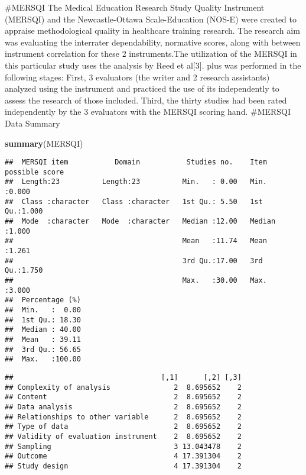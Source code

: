 \documentclass[]{article}
\newenvironment{Shaded}{\begin{snugshade}}{\end{snugshade}}
\newcommand{\KeywordTok}[1]{\textcolor[rgb]{0.13,0.29,0.53}{\textbf{#1}}}
\newcommand{\NormalTok}[1]{#1}
\newcommand{\OperatorTok}[1]{\textcolor[rgb]{0.81,0.36,0.00}{\textbf{#1}}}
\begin{document}
\#MERSQI The Medical Education Research Study Quality Instrument
(MERSQI) and the Newcastle-Ottawa Scale-Education (NOS-E) were created
to appraise methodological quality in healthcare training research. The
research aim was evaluating the interrater dependability, normative
scores, along with between instrument correlation for these 2
instruments.The utilization of the MERSQI in this particular study uses
the analysis by Reed et al{[}3{]}. plus was performed in the following
stages: First, 3 evaluators (the writer and 2 research assistants)
analyzed using the instrument and practiced the use of its independently
to assess the research of those included. Third, the thirty studies had
been rated independently by the 3 evaluators with the MERSQI scoring
hand. \#MERSQI Data Summary

\begin{Shaded}
\begin{Highlighting}[]
\KeywordTok{summary}\NormalTok{(MERSQI)}
\end{Highlighting}
\end{Shaded}

\begin{verbatim}
##  MERSQI item           Domain           Studies no.    Item possible score
##  Length:23          Length:23          Min.   : 0.00   Min.   :0.000      
##  Class :character   Class :character   1st Qu.: 5.50   1st Qu.:1.000      
##  Mode  :character   Mode  :character   Median :12.00   Median :1.000      
##                                        Mean   :11.74   Mean   :1.261      
##                                        3rd Qu.:17.00   3rd Qu.:1.750      
##                                        Max.   :30.00   Max.   :3.000      
##  Percentage (%)  
##  Min.   :  0.00  
##  1st Qu.: 18.30  
##  Median : 40.00  
##  Mean   : 39.11  
##  3rd Qu.: 56.65  
##  Max.   :100.00
\end{verbatim}

\begin{Shaded}
\end{Shaded}

\begin{verbatim}
##                                   [,1]      [,2] [,3]
## Complexity of analysis               2  8.695652    2
## Content                              2  8.695652    2
## Data analysis                        2  8.695652    2
## Relationships to other variable      2  8.695652    2
## Type of data                         2  8.695652    2
## Validity of evaluation instrument    2  8.695652    2
## Sampling                             3 13.043478    2
## Outcome                              4 17.391304    2
## Study design                         4 17.391304    2
\end{verbatim}
\end{document}
